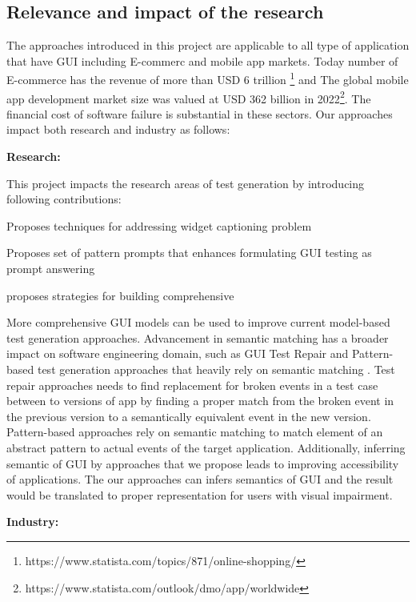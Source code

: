 \subsection{Relevance and impact of the research }
The approaches introduced in this project are applicable to all type of application that have GUI including E-commerc and mobile app markets.
Today number of E-commerce has the revenue of more than USD 6 trillion \footnote{https://www.statista.com/topics/871/online-shopping/} and 
The global mobile app development market size was valued at USD 362 billion in 2022\footnote{https://www.statista.com/outlook/dmo/app/worldwide}.
The financial cost of software failure is substantial in these sectors. 
Our approaches impact both research and industry as follows:




\bigskip
\noindent
\textbf{Research:}

\noindent
This project impacts the research areas of test generation by introducing following contributions:
\begin{inparaenum}[(i)]
\item Proposes techniques for addressing widget captioning problem
\item Proposes set of pattern prompts that enhances formulating GUI testing  as prompt answering
\item proposes strategies for building comprehensive \tam
\end{inparaenum}
More comprehensive GUI models can be used to improve current model-based test generation approaches.
Advancement in semantic matching has a broader impact on software engineering domain, such as GUI Test Repair and Pattern-based test generation approaches that heavily rely on semantic matching .
Test repair approaches needs to find replacement for broken events in a test case between to versions of app by finding a proper match from the broken event in the previous version to a semantically equivalent event in the new version.
Pattern-based approaches rely on semantic matching to match element of an abstract pattern to actual events of the target application.
Additionally, inferring semantic of GUI by approaches that we propose leads to improving accessibility of applications.
The our approaches can infers semantics of GUI and the result would be translated to proper representation for users with visual impairment.  


\bigskip
\noindent
\textbf{Industry:}

